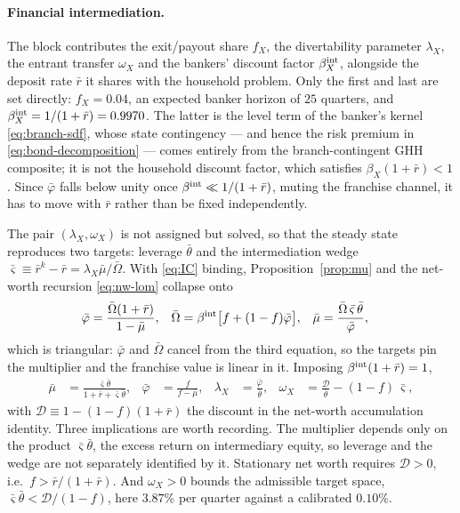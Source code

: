 \paragraph{Financial intermediation.}
The block contributes the exit/payout share $f_X$, the divertability parameter
$\lambda_X$, the entrant transfer $\omega_X$ and the bankers' discount factor
$\beta^{\rm int}_X$, alongside the deposit rate $\bar r$ it shares with the
household problem. Only the first and last are set directly: $f_X=0.04$, an
expected banker horizon of $25$ quarters, and
$\beta^{\rm int}_X=1/(1+\bar r)=0.9970$. The latter is the level term of the
banker's kernel \eqref{eq:branch-sdf}, whose state contingency --- and hence the
risk premium in \eqref{eq:bond-decomposition} --- comes entirely from the
branch-contingent GHH composite; it is not the household discount factor, which
satisfies $\beta_X(1+\bar r)<1$. Since $\bar\varphi$ falls below unity once
$\beta^{\rm int}\ll1/(1+\bar r)$, muting the franchise channel, it has to move
with $\bar r$ rather than be fixed independently.

The pair $(\lambda_X,\omega_X)$ is not assigned but solved, so that the steady
state reproduces two targets: leverage $\bar\theta$ and the intermediation wedge
$\bar\varsigma\equiv\bar r^{k}-\bar r=\lambda_X\bar\mu/\bar\Omega$. With
\eqref{eq:IC} binding, Proposition~\ref{prop:mu} and the net-worth recursion
\eqref{eq:nw-lom} collapse onto
\begin{align}
\bar\varphi&=\frac{\bar\Omega(1+\bar r)}{1-\bar\mu},
&
\bar\Omega&=\beta^{\rm int}\bigl[f+(1-f)\bar\varphi\bigr],
&
\bar\mu&=\frac{\bar\Omega\,\bar\varsigma\,\bar\theta}{\bar\varphi} ,
\label{eq:ss-system}
\end{align}
which is triangular: $\bar\varphi$ and $\bar\Omega$ cancel from the third
equation, so the targets pin the multiplier and the franchise value is linear in
it. Imposing $\beta^{\rm int}(1+\bar r)=1$,
\begin{align}
\bar\mu&=\frac{\bar\varsigma\bar\theta}{1+\bar r+\bar\varsigma\bar\theta},
&
\bar\varphi&=\frac{f}{f-\bar\mu},
&
\lambda_X&=\frac{\bar\varphi}{\bar\theta},
&
\omega_X&=\frac{\mathcal{D}}{\bar\theta}-(1-f)\,\bar\varsigma,
\label{eq:ss-closedform}
\end{align}
with $\mathcal{D}\equiv1-(1-f)(1+\bar r)$ the discount in the net-worth
accumulation identity. Three implications are worth recording. The multiplier
depends only on the product $\bar\varsigma\bar\theta$, the excess return on
intermediary equity, so leverage and the wedge are not separately identified by
it. Stationary net worth requires $\mathcal{D}>0$, i.e.\ $f>\bar r/(1+\bar r)$.
And $\omega_X>0$ bounds the admissible target space,
$\bar\varsigma\bar\theta<\mathcal{D}/(1-f)$, here $3.87\%$ per quarter against a
calibrated $0.10\%$.

